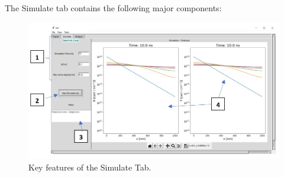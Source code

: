 \documentclass[11pt,letterpaper,titlepage]{article}
\begin{document}
	\par The Simulate tab contains the following major components:
	
	\begin{figure}[H]
		\label{fig:simulate_overview}
		\centering
		\includegraphics[scale=0.6]{"simulate_overview"}
		\caption{Key features of the Simulate Tab.}
	\end{figure}
	
\end{document}
